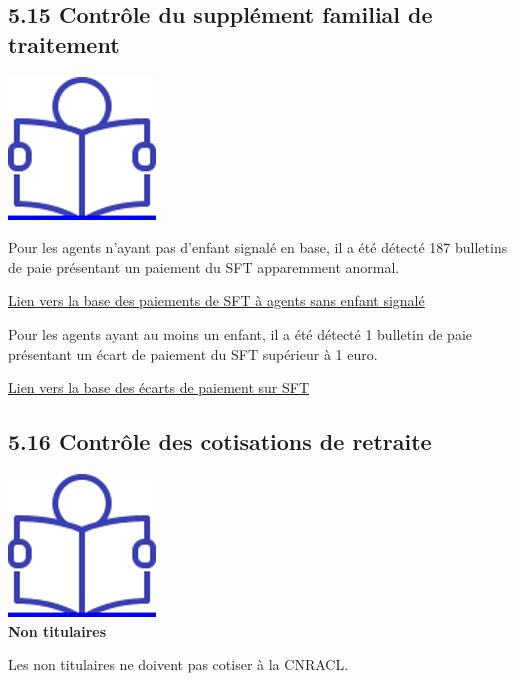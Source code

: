 \hypertarget{controle-du-supplement-familial-de-traitement}{%
\subsection{5.15 Contrôle du supplément familial de
traitement}\label{controle-du-supplement-familial-de-traitement}}

\href{../Docs/Notices/fiche_SFT.odt}{\includegraphics{icones/Notice.png}}

Pour les agents n'ayant pas d'enfant signalé en base, il a été détecté
187 bulletins de paie présentant un paiement du SFT apparemment anormal.

\href{../Bases/Reglementation/Paie.sans.enfant.reduit.csv}{Lien vers la
base des paiements de SFT à agents sans enfant signalé}

Pour les agents ayant au moins un enfant, il a été détecté 1 bulletin de
paie présentant un écart de paiement du SFT supérieur à 1 euro.

\href{../Bases/Reglementation/controle.sft.csv}{Lien vers la base des
écarts de paiement sur SFT}

\hypertarget{controle-des-cotisations-de-retraite}{%
\subsection{5.16 Contrôle des cotisations de
retraite}\label{controle-des-cotisations-de-retraite}}

\href{../Docs/Notices/fiche_retraite.odt}{\includegraphics{icones/Notice.png}}\\
\textbf{Non titulaires}

Les non titulaires ne doivent pas cotiser à la CNRACL.

